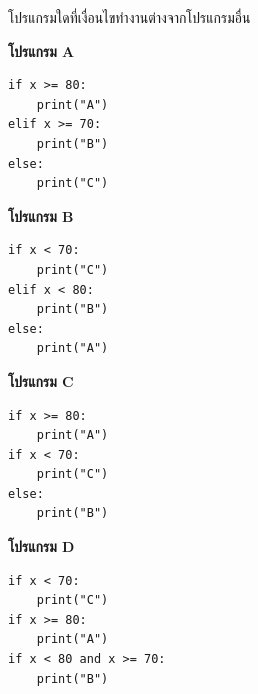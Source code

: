 \question โปรแกรมใดที่เงื่อนไขทำงานต่างจากโปรแกรมอื่น

\begin{center}
\begin{minipage}[t]{0.45\textwidth}
\textbf{โปรแกรม A}
\begin{verbatim}
if x >= 80:
    print("A")
elif x >= 70:
    print("B")
else:
    print("C")
\end{verbatim}
\end{minipage}
\hfill
\begin{minipage}[t]{0.45\textwidth}
\textbf{โปรแกรม B}
\begin{verbatim}
if x < 70:
    print("C")
elif x < 80:
    print("B")
else:
    print("A")
\end{verbatim}
\end{minipage}

\vspace{6pt}

\begin{minipage}[t]{0.45\textwidth}
\textbf{โปรแกรม C}
\begin{verbatim}
if x >= 80:
    print("A")
if x < 70:
    print("C")
else:
    print("B")
\end{verbatim}
\end{minipage}
\hfill
\begin{minipage}[t]{0.45\textwidth}
\textbf{โปรแกรม D}
\begin{verbatim}
if x < 70:
    print("C")
if x >= 80:
    print("A")
if x < 80 and x >= 70:
    print("B")
\end{verbatim}
\end{minipage}
\end{center}


